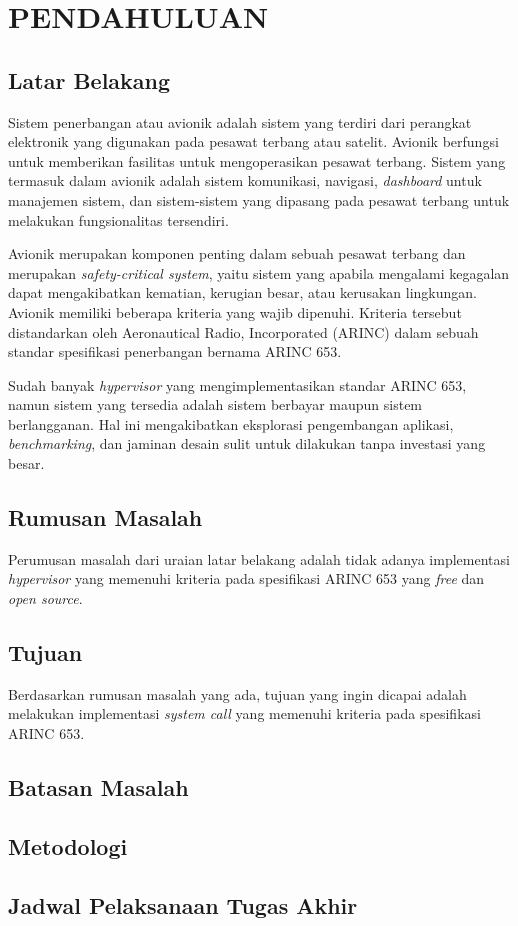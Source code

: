 \chapter{PENDAHULUAN}

\section{Latar Belakang}

Sistem penerbangan atau avionik adalah sistem yang terdiri dari perangkat elektronik yang digunakan pada pesawat terbang
atau satelit. Avionik berfungsi untuk memberikan fasilitas untuk mengoperasikan pesawat terbang. Sistem yang termasuk
dalam avionik adalah sistem komunikasi, navigasi, \textit{dashboard} untuk manajemen sistem, dan sistem-sistem yang
dipasang pada pesawat terbang untuk melakukan fungsionalitas tersendiri.

Avionik merupakan komponen penting dalam sebuah pesawat terbang dan merupakan \textit{safety-critical system}, yaitu
sistem yang apabila mengalami kegagalan dapat mengakibatkan kematian, kerugian besar, atau kerusakan lingkungan. Avionik
memiliki beberapa kriteria yang wajib dipenuhi. Kriteria tersebut distandarkan oleh Aeronautical Radio, Incorporated
(ARINC) dalam sebuah standar spesifikasi penerbangan bernama ARINC 653.

Sudah banyak \textit{hypervisor} yang mengimplementasikan standar ARINC 653, namun sistem yang tersedia adalah sistem
berbayar maupun sistem berlangganan. Hal ini mengakibatkan eksplorasi pengembangan aplikasi, \textit{benchmarking}, dan
jaminan desain sulit untuk dilakukan tanpa investasi yang besar.

\section{Rumusan Masalah}

Perumusan masalah dari uraian latar belakang adalah tidak adanya implementasi \textit{hypervisor} yang memenuhi kriteria
pada spesifikasi ARINC 653 yang \textit{free} dan \textit{open source}.

\section{Tujuan}

Berdasarkan rumusan masalah yang ada, tujuan yang ingin dicapai adalah melakukan implementasi \textit{system call} yang
memenuhi kriteria pada spesifikasi ARINC 653.

\section{Batasan Masalah}


\section{Metodologi}


\section{Jadwal Pelaksanaan Tugas Akhir}

